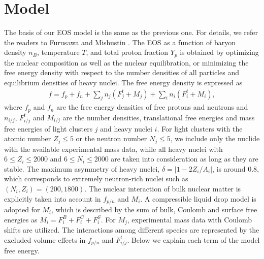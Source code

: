 \documentclass[preprint]{revtex4}
\begin{document}
\section{Model \label{sec:model}}
The basis of our EOS  model is 
the same as the previous one. For details, we refer the readers to Furusawa and Mishustin \cite{furusawa17c}.
The  EOS as a function of baryon density $n_B$,  temperature $T$, and total proton fraction $Y_p$  
is obtained by optimizing the nuclear composition as well as the nuclear equilibration, or minimizing the free energy density with respect to the number densities  of all particles and equilibrium densities of heavy nuclei.
The free energy density 
 is expressed as
\begin{eqnarray}
f = f_p + f_n  +  \sum_j  n_j (F^t_{j} + M_{j})+ \sum_i  n_i (F^t_{i} + M_{i}) ,
\label{total}
\end{eqnarray}
where $f_p$ and $f_n$  are the free energy densities of free protons and neutrons  and $n_{i/j}$,
$F^t_{i/j}$ and $M_{i/j}$ are the number densities, 
translational free energies and mass free energies of  light clusters $j$  and heavy nuclei $i$.
{%
For light clusters with  the atomic number  $Z_j \leq5$ or  the neutron number $N_j \leq5$, we include only the nuclide with the  available experimental mass data, 
while  all heavy nuclei with  $6 \leq Z_i \leq 2000$ and  $6 \leq N_i \leq 2000$ are taken into consideration as long as they are stable. The maximum asymmetry of heavy nuclei, $\delta=|1-2Z_i/A_i|$, is around 0.8, which  corresponds to extremely neutron-rich nuclei such as $(N_i,Z_i)=(200, 1800)$.} 
{%
The nuclear interaction of bulk nuclear matter is explicitly taken into account in  $f_{p/n}$ and $M_i$.  
A compressible liquid drop model is adopted for $M_i$, which is described by the sum of bulk, Coulomb and surface free energies as $M_i=F_i^B+F_i^C+F_i^S$.
For $M_j$, experimental mass data with Coulomb shifts are utilized. 
The interactions among different species are represented by the excluded volume effects in $f_{p/n}$ and $F^t_{i/j}$.}
Below we explain each term of the model free energy.
\end{document}
